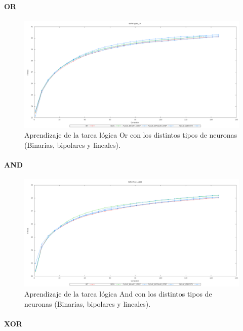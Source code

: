\documentclass[11pt]{article}
\begin{document}
\begin{titlepage}
\paragraph{OR}
\label{sec-6-2-2-1}


\begin{figure}[htb]
\centering
\includegraphics[width=\textwidth]{./img/BufferTypes_OR.png}
\caption{\label{aprenDiscretOr}Aprendizaje de la tarea lógica Or con los distintos tipos de neuronas (Binarias, bipolares y lineales).}
\end{figure}

\newpage
\paragraph{AND}
\label{sec-6-2-2-2}


\begin{figure}[htb]
\centering
\includegraphics[width=\textwidth]{./img/BufferTypes_AND.png}
\caption{\label{aprenDiscretAnd}Aprendizaje de la tarea lógica And con los distintos tipos de neuronas (Binarias, bipolares y lineales).}
\end{figure}

\newpage
\paragraph{XOR}
\label{sec-6-2-2-3}



\end{titlepage}
\end{document}
